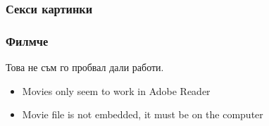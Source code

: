 \documentclass[serif,mathserif,14pt]{beamer}
\begin{document}
\begin{frame}
  \frametitle{Секси картинки}
  \begin{figure}[t]
    \centering
  \end{figure}
\end{frame}

\begin{frame}
  \frametitle{Филмче}
   Това не съм го пробвал дали работи.
  \begin{center}
  \end{center}
  \begin{itemize}
  \item Movies only seem to work in Adobe Reader
  \item Movie file is not embedded, it must be on the computer
  \end{itemize}
\end{frame}

\end{document}
